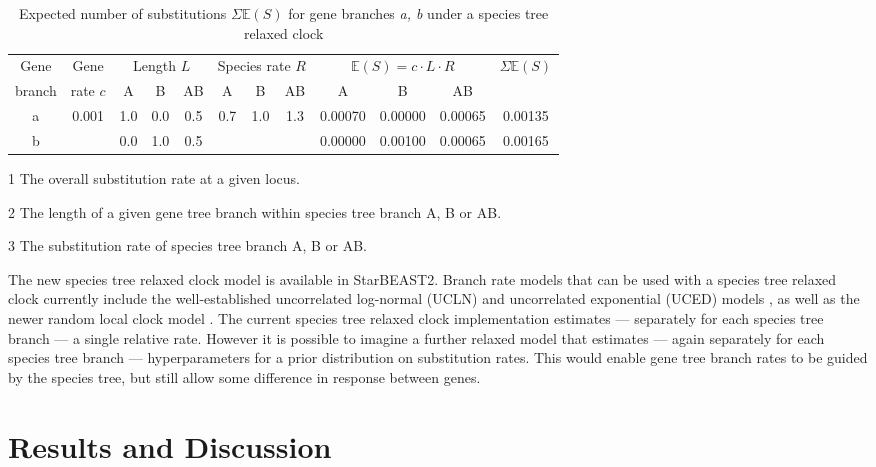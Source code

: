 \documentclass[nogrid]{MBE}%
\begin{document}
\begin{table}[htb!]
\caption{Expected number of substitutions $\Sigma \mathbb{E}(S)$ for gene branches \textit{a, b} under a species tree relaxed clock}
\label{tab:branchRateModel}
\begin{threeparttable}
\begin{tabular*}{\textwidth}{@{\extracolsep{\fill}}cccccccccccc@{}}
\hline
Gene & Gene & \multicolumn{3}{c}{Length\tnote{2} $L$} & \multicolumn{3}{c}{Species rate\tnote{3} $R$} & \multicolumn{3}{c}{$\mathbb{E}(S) = c\cdot L\cdot R$} & \multirow{2}{*}{$\Sigma \mathbb{E}(S)$}\tabularnewline
branch & rate\tnote{1} $c$ & A & B & AB & A & B & AB & A & B & AB & \tabularnewline
\hline
a & \multirow{2}{*}{0.001} & 1.0 & 0.0 & 0.5 & \multirow{2}{*}{0.7} & \multirow{2}{*}{1.0} & \multirow{2}{*}{1.3} & 0.00070 & 0.00000 & 0.00065 & 0.00135\tabularnewline
b & & 0.0 & 1.0 & 0.5 & & & & 0.00000 & 0.00100 & 0.00065 & 0.00165\tabularnewline
\hline
\end{tabular*}
\begin{tablenotes}
\item[1] The overall substitution rate at a given locus.
\item[2] The length of a given gene tree branch within species tree branch A, B or AB.
\item[3] The substitution rate of species tree branch A, B or AB.
\end{tablenotes}
\end{threeparttable}
\end{table}

The new species tree relaxed clock model is available in StarBEAST2. Branch
rate models that can be used with a species tree relaxed clock currently
include the well-established uncorrelated log-normal (UCLN) and uncorrelated
exponential (UCED) models \citep{10.1371/journal.pbio.0040088}, as well as the
newer random local clock model \citep{Drummond2010}. The current species tree
relaxed clock implementation estimates --- separately for each species tree
branch --- a single relative rate. However it is possible to imagine a further
relaxed model that estimates --- again separately for each species tree branch
--- hyperparameters for a prior distribution on substitution rates. This would
enable gene tree branch rates to be guided by the species tree, but still
allow some difference in response between genes.

\section{Results and Discussion}
\end{document}
